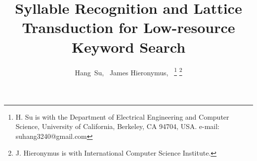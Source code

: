\documentclass[journal]{IEEEtran}
\begin{document}
%
\title{Syllable Recognition and Lattice Transduction for Low-resource Keyword Search}
%
%
%

\author{Hang~Su,~
        James Hieronymus,~%
\thanks{H. Su is with the Department of Electrical Engineering and Computer Science,
University of California, Berkeley, CA 94704, USA. e-mail: suhang3240@gmail.com}%
\thanks{J. Hieronymus is with International Computer Science Institute.}}

% 
%



% 
\end{document}
